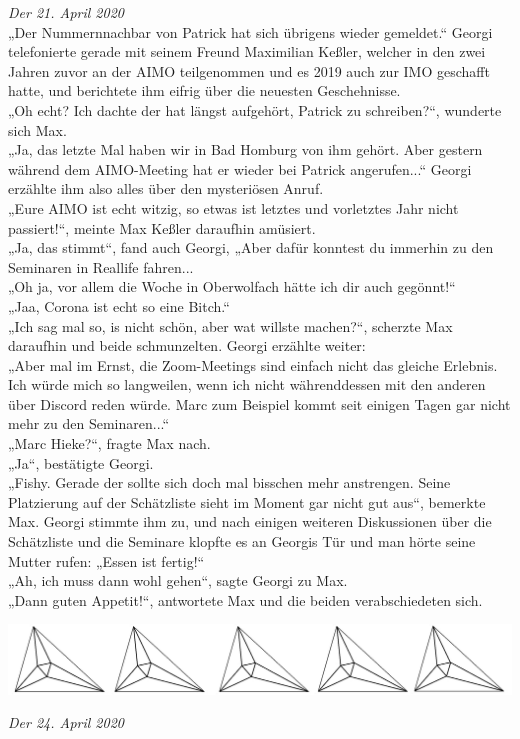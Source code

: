 \documentclass[oneside]{memoir}
\newcommand{\parasep}{
\bigskip
\bigskip
\begin{center} 
   \includegraphics[scale=.08]{parasep5.jpg} 
\end{center}
\bigskip
\bigskip
}
\begin{document}
\textit{Der 21. April 2020} \\ 
„Der Nummernnachbar von Patrick hat sich übrigens wieder gemeldet.“ Georgi telefonierte gerade mit seinem Freund Maximilian Keßler, welcher in den zwei Jahren zuvor an der AIMO teilgenommen und es 2019 auch zur IMO geschafft hatte, und berichtete ihm eifrig über die neuesten Geschehnisse. \\
 „Oh echt? Ich dachte der hat längst aufgehört, Patrick zu schreiben?“, wunderte sich Max. \\
 „Ja, das letzte Mal haben wir in Bad Homburg von ihm gehört. Aber gestern während dem AIMO-Meeting hat er wieder bei Patrick angerufen...“ Georgi erzählte ihm also alles über den mysteriösen Anruf. \\
 „Eure AIMO ist echt witzig, so etwas ist letztes und vorletztes Jahr nicht passiert!“, meinte Max Keßler daraufhin amüsiert. \\
 „Ja, das stimmt“, fand auch Georgi, „Aber dafür konntest du immerhin zu den Seminaren in Reallife fahren... \\
  „Oh ja, vor allem die Woche in Oberwolfach hätte ich dir auch gegönnt!“ \\
   „Jaa, Corona ist echt so eine Bitch.“ \\
    „Ich sag mal so, is nicht schön, aber wat willste machen?“, scherzte Max daraufhin und beide schmunzelten. Georgi erzählte weiter: \\
    „Aber mal im Ernst, die Zoom-Meetings sind einfach nicht das gleiche Erlebnis. Ich würde mich so langweilen, wenn ich nicht währenddessen mit den anderen über Discord reden würde. Marc zum Beispiel kommt seit einigen Tagen gar nicht mehr zu den Seminaren...“ \\
    „Marc Hieke?“, fragte Max nach. \\
     „Ja“, bestätigte Georgi. \\
     „Fishy. Gerade der sollte sich doch mal bisschen mehr anstrengen. Seine Platzierung auf der Schätzliste sieht im Moment gar nicht gut aus“, bemerkte Max. Georgi stimmte ihm zu, und nach einigen weiteren Diskussionen über die Schätzliste und die Seminare klopfte es an Georgis Tür und man hörte seine Mutter rufen: „Essen ist fertig!“ \\
     „Ah, ich muss dann wohl gehen“, sagte Georgi zu Max. \\
     „Dann guten Appetit!“, antwortete Max und die beiden verabschiedeten sich.
     
     \parasep
     \textit{Der 24. April 2020} \\ 
     
\end{document}
